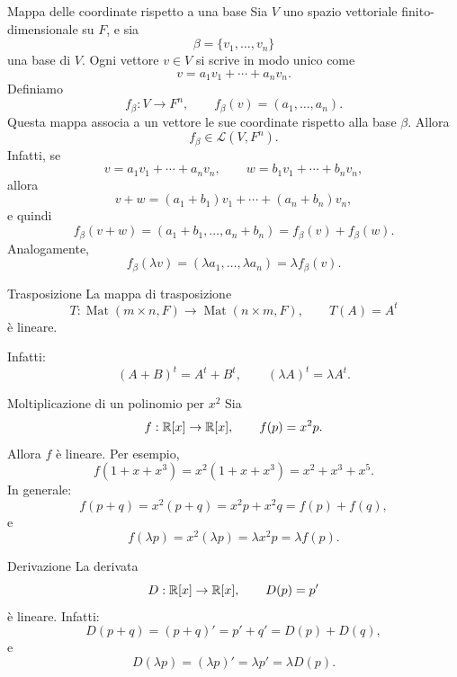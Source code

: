 \documentclass[a4paper]{article}
\begin{document}
\begin{snippetexample}{Mappa delle coordinate rispetto a una base}
    Sia \(V\) uno spazio vettoriale finito-dimensionale su \(F\), e sia
    \[
        \beta=\{v_1,\ldots,v_n\}
    \]
    una base di \(V\). Ogni vettore \(v\in V\) si scrive in modo unico come
    \[
        v=a_1v_1+\cdots+a_nv_n.
    \]
    Definiamo
    \[
        f_\beta:V\to F^n,
        \qquad
        f_\beta(v)=(a_1,\ldots,a_n).
    \]
    Questa mappa associa a un vettore le sue coordinate rispetto alla base \(\beta\). Allora
    \[
        f_\beta\in\mathcal{L}(V,F^n).
    \]
    Infatti, se
    \[
        v=a_1v_1+\cdots+a_nv_n,
        \qquad
        w=b_1v_1+\cdots+b_nv_n,
    \]
    allora
    \[
        v+w=(a_1+b_1)v_1+\cdots+(a_n+b_n)v_n,
    \]
    e quindi
    \[
        f_\beta(v+w)
        =
        (a_1+b_1,\ldots,a_n+b_n)
        =
        f_\beta(v)+f_\beta(w).
    \]
    Analogamente,
    \[
        f_\beta(\lambda v)
        =
        (\lambda a_1,\ldots,\lambda a_n)
        =
        \lambda f_\beta(v).
    \]
\end{snippetexample}

\begin{snippetexample}{Trasposizione}
    La mappa di trasposizione
    \[
        T:\operatorname{Mat}(m\times n,F)\to \operatorname{Mat}(n\times m,F),
        \qquad
        T(A)=A^t
    \]
    è lineare.

    Infatti:
    \[
        (A+B)^t=A^t+B^t,
        \qquad
        (\lambda A)^t=\lambda A^t.
    \]
\end{snippetexample}

\begin{snippetexample}{Moltiplicazione di un polinomio per \(x^2\)}
    Sia
    \[
        f:\mathbb{R}[x]\to\mathbb{R}[x],
        \qquad
        f(p)=x^2p.
    \]
    Allora \(f\) è lineare. Per esempio,
    \[
        f(1+x+x^3)=x^2(1+x+x^3)=x^2+x^3+x^5.
    \]
    In generale:
    \[
        f(p+q)=x^2(p+q)=x^2p+x^2q=f(p)+f(q),
    \]
    e
    \[
        f(\lambda p)=x^2(\lambda p)=\lambda x^2p=\lambda f(p).
    \]
\end{snippetexample}

\begin{snippetexample}{Derivazione}
    La derivata
    \[
        D:\mathbb{R}[x]\to\mathbb{R}[x],
        \qquad
        D(p)=p'
    \]
    è lineare. Infatti:
    \[
        D(p+q)=(p+q)'=p'+q'=D(p)+D(q),
    \]
    e
    \[
        D(\lambda p)=(\lambda p)'=\lambda p'=\lambda D(p).
    \]
\end{snippetexample}
\end{document}
